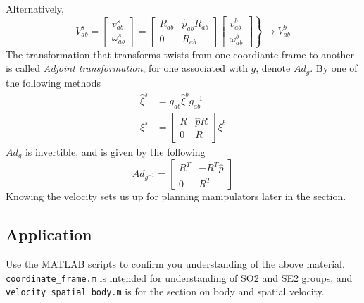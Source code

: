 \documentclass[letterpaper]{article}
\begin{document}
Alternatively, 
\begin{equation*}
  V^{s}_{ab} = \begin{bmatrix}
    v^{s}_{ab}\\\omega^{s}_{ab}
  \end{bmatrix} = 
  \begin{bmatrix}
    R_{ab} & \widehat{p}_{ab}R_{ab}\\
    0 & R_{ab}
  \end{bmatrix}
  \left.\begin{bmatrix}
    v^{b}_{ab}\\\omega^b_{ab}
  \end{bmatrix}\right\}\rightarrow V^{b}_{ab}
\end{equation*}
The transformation that transforms twists from one coordiante frame to another is called
\emph{Adjoint transformation}, for one associated with $g$, denote $Ad_g$.
By one of the following methods
\begin{equation*}
  \begin{split}
    \widehat{\xi}^s & = g_{ab}\widehat{\xi}^bg^{-1}_{ab}\\
    \xi^s & = \begin{bmatrix}
      R & \widehat{p}R \\ 0 & R
    \end{bmatrix} \xi^b
  \end{split}
\end{equation*}
$Ad_g$ is invertible, and is given by the following
\begin{equation*}
  Ad_{g^{-1}} = \begin{bmatrix}
    R^T & -R^T\widehat{p} \\ 0 & R^T
  \end{bmatrix}
\end{equation*}
Knowing the velocity sets us up for planning manipulators later in the section. 

\subsection{Application}
Use the MATLAB scripts to confirm you understanding of the above material. \texttt{coordinate\_frame.m}
is intended for understanding of SO2 and SE2 groups, and \texttt{velocity\_spatial\_body.m} is for the
section on body and spatial velocity. 
\end{document}

